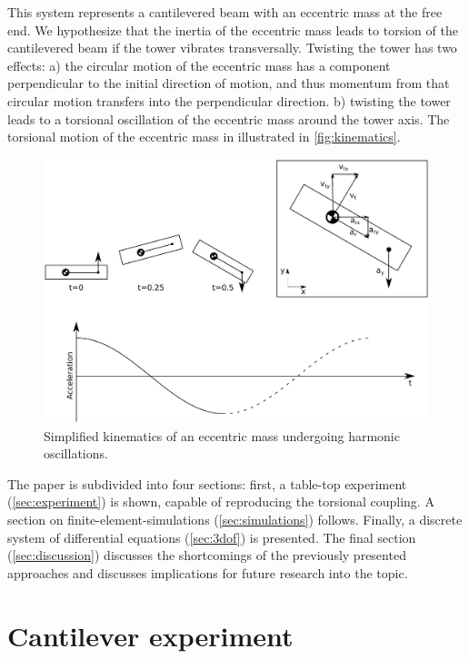 \documentclass{article}
\begin{document}
This system represents a cantilevered beam with an eccentric mass at the free end. We hypothesize that the inertia of the eccentric mass leads to torsion of the cantilevered beam if the tower vibrates transversally. Twisting the tower has two effects: a) the circular motion of the eccentric mass has a component perpendicular to the initial direction of motion, and thus momentum from that circular motion transfers into the perpendicular direction. b) twisting the tower leads to a torsional oscillation of the eccentric mass around the tower axis. The torsional motion of the eccentric mass in illustrated in \autoref{fig:kinematics}.

\begin{figure}[ht!]
    \centering
    \includegraphics[width=0.7\linewidth]{manuscript/figures/kinematics.pdf}
    \caption{Simplified kinematics of an eccentric mass undergoing harmonic oscillations.}
    \label{fig:kinematics}
\end{figure}

The paper is subdivided into four sections: first, a table-top experiment (\autoref{sec:experiment}) is shown, capable of reproducing the torsional coupling. A section on finite-element-simulations (\autoref{sec:simulations}) follows. Finally, a discrete system of differential equations (\autoref{sec:3dof}) is presented. The final section (\autoref{sec:discussion}) discusses the shortcomings of the previously presented approaches and discusses implications for future research into the topic. 

\clearpage

\section{Cantilever experiment}
\label{sec:experiment}
\end{document}
